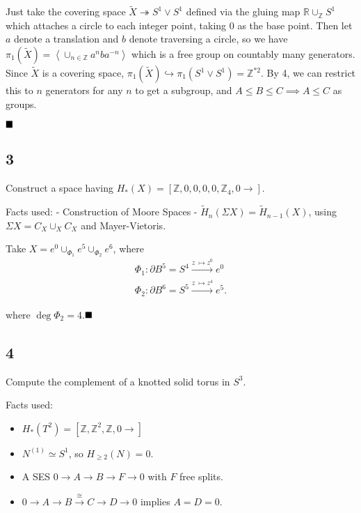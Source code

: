 Just take the covering space
\(\tilde X \twoheadrightarrow S^1 \vee S^1\) defined via the gluing map
\({\mathbb{R}}\cup_{{\mathbb{Z}}} S^1\) which attaches a circle to each
integer point, taking 0 as the base point. Then let \(a\) denote a
translation and \(b\) denote traversing a circle, so we have
\(\pi_1(\tilde X) = \left<\cup_{n\in{\mathbb{Z}}}a^nba^{-n}\right>\)
which is a free group on countably many generators. Since \(\tilde X\)
is a covering space,
\(\pi_1(\tilde X) \hookrightarrow\pi_1(S^1 \vee S^1) = {\mathbb{Z}}^{\ast 2}\).
By 4, we can restrict this to \(n\) generators for any \(n\) to get a
subgroup, and \(A\leq B \leq C \implies A \leq C\) as groups.

\(\hfill\blacksquare\)

\hypertarget{section-7}{%
\subsection{3}\label{section-7}}

Construct a space having
\(H_*(X) = [{\mathbb{Z}}, 0, 0, 0, 0, {\mathbb{Z}}_4, 0\rightarrow]\).

Facts used: - Construction of Moore Spaces -
\(\tilde H_n(\Sigma X) = \tilde H_{n-1}(X)\), using
\(\Sigma X = C_X \cup_X C_X\) and Mayer-Vietoris.

Take \(X = e^0 \cup_{\Phi_1} e^5 \cup_{\Phi_2} e^6\), where
\begin{align*} \Phi_1: {\partial}B^5 = S^4 \xrightarrow{z~\mapsto z^0} e^0 \\ \Phi_2: {\partial}B^6 = S^5 \xrightarrow{z~\mapsto z^4} e^5 .\end{align*}

where \(\deg \Phi_2 = 4\).\(\hfill\blacksquare\)

\hypertarget{section-8}{%
\subsection{4}\label{section-8}}

Compute the complement of a knotted solid torus in \(S^3\).

Facts used:

\begin{itemize}
\tightlist
\item
  \(H_*(T^2) = [{\mathbb{Z}}, {\mathbb{Z}}^2, {\mathbb{Z}}, 0\rightarrow]\)
\item
  \(N^{(1)} \simeq S^1\), so \(H_{\geq 2}(N) = 0\).
\item
  A SES \(0\to A\to B \to F \to 0\) with \(F\) free splits.
\item
  \(0\to A \to B \xrightarrow{\cong} C \to D \to 0\) implies
  \(A = D = 0\).
\end{itemize}

